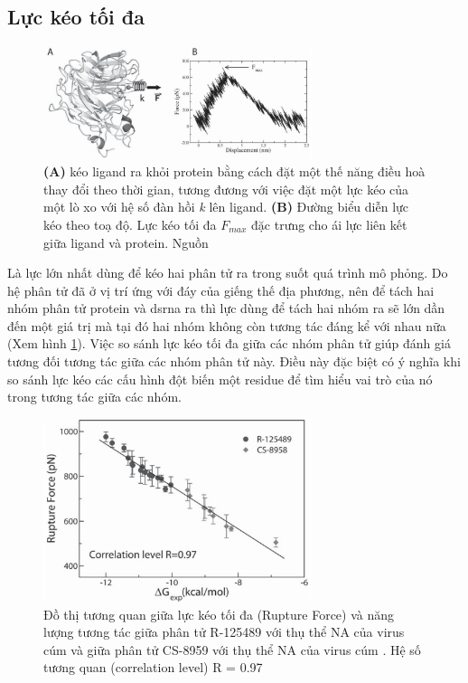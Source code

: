 \documentclass[12pt,a4paper,reqno, oneside]{book}
\begin{document}
	\subsection{Lực kéo tối đa}
	\begin{figure}[t!]
	\centering
	\includegraphics[width=0.7\textwidth,natwidth=610,natheight=642]{pull-force}
	\caption{\textbf{(A)} kéo ligand ra khỏi protein bằng cách đặt một thế năng điều hoà thay đổi theo thời gian, tương đương với việc đặt một lực kéo của một lò xo với hệ số đàn hồi \textit{k} lên ligand. \textbf{(B)} Đường biểu diễn lực kéo theo toạ độ. Lực kéo tối đa $F_{max}$ đặc trưng cho ái lực liên kết giữa ligand và protein. Nguồn \cite{SuanLi2012}}
	\label{fig:rupture-force}
	\end{figure}
	Là lực lớn nhất dùng để kéo hai phân tử ra trong suốt quá trình mô phỏng. Do hệ phân tử đã ở vị trí ứng với đáy của giếng thế địa phương, nên để tách hai nhóm phân tử protein và \gls{dsrna} ra thì lực dùng để tách hai nhóm ra sẽ lớn dần đến một giá trị mà tại đó hai nhóm không còn tương tác đáng kể với nhau nữa (Xem hình \ref{fig:rupture-force}).
	Việc so sánh lực kéo tối đa giữa các nhóm phân tử giúp đánh giá tương đối tương tác giữa các nhóm phân tử này. Điều này đặc biệt có ý nghĩa khi so sánh lực kéo các cấu hình đột biến một \gls{residue} để tìm hiểu vai trò của nó trong tương tác giữa các nhóm.
	\begin{figure}[h!]
	\centering
	\includegraphics[width=0.7\textwidth,natwidth=610,natheight=642]{rupture_force-delta_G}
	\caption{Đồ thị tương quan giữa lực kéo tối đa (Rupture Force) và năng lượng tương tác giữa phân tử R-125489 với thụ thể NA của virus cúm và giữa phân tử CS-8959 với thụ thể NA của virus cúm \cite{SuanLi2012}. Hệ số tương quan (correlation level) R = 0.97}
	\label{fig:rupture-force-delta-g}
	\end{figure}
\end{document}
